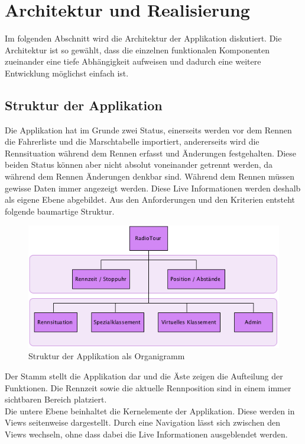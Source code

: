 \chapter{Architektur und Realisierung}
Im folgenden Abschnitt wird die Architektur der Applikation diskutiert. Die Architektur ist so gewählt, dass die einzelnen funktionalen Komponenten zueinander eine tiefe Abhängigkeit aufweisen und dadurch eine weitere Entwicklung möglichst einfach ist.

\section{Struktur der Applikation}
Die Applikation hat im Grunde zwei Status, einerseits werden vor dem Rennen die Fahrerliste und die Marschtabelle importiert, andererseits wird die Rennsituation während dem Rennen erfasst und Änderungen festgehalten. Diese beiden Status können aber nicht absolut voneinander getrennt werden, da während dem Rennen Änderungen denkbar sind. Während dem Rennen müssen gewisse Daten immer angezeigt werden. Diese Live Informationen werden deshalb als eigene Ebene abgebildet. Aus den Anforderungen und den Kriterien entsteht folgende baumartige Struktur.

\begin{figure}[h!]
\caption{Struktur der Applikation als Organigramm}
\centering
\includegraphics{05bericht/images/struktur.png}
\end{figure} 

Der Stamm stellt die Applikation dar und die Äste zeigen die Aufteilung der Funktionen. Die Rennzeit sowie die aktuelle Rennposition sind in einem immer sichtbaren Bereich platziert.
\\
Die untere Ebene beinhaltet die Kernelemente der Applikation. Diese werden in Views seitenweise dargestellt. Durch eine Navigation lässt sich zwischen den Views wechseln, ohne dass dabei die Live Informationen ausgeblendet werden.


